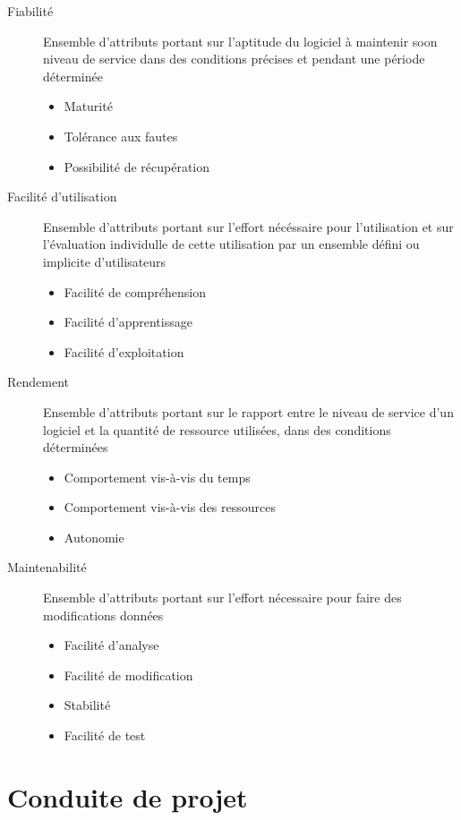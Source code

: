\documentclass{mise_en_page}
\begin{document}
\begin{description}
	\item[Fiabilité]
		Ensemble d'attributs portant sur l'aptitude du logiciel à maintenir soon niveau de service dans des conditions précises et pendant une période déterminée
		\begin{itemize}
			\item Maturité
			\item Tolérance aux fautes
			\item Possibilité de récupération
		\end{itemize}
	\item[Facilité d'utilisation]
		Ensemble d'attributs portant sur l'effort nécéssaire pour l'utilisation et sur l'évaluation individulle de cette utilisation par un ensemble défini ou implicite d'utilisateurs
		\begin{itemize}
			\item Facilité de compréhension
			\item Facilité d'apprentissage
			\item Facilité d'exploitation
		\end{itemize}
	\item[Rendement]
		Ensemble d'attributs portant sur le rapport entre le niveau de service d'un logiciel et la quantité de ressource utilisées, dans des conditions déterminées
		\begin{itemize}
			\item Comportement vis-à-vis du temps
			\item Comportement vis-à-vis des ressources
			\item Autonomie
		\end{itemize}
	\item[Maintenabilité]
		Ensemble d'attributs portant sur l'effort nécessaire pour faire des modifications données
		\begin{itemize}
			\item Facilité d'analyse
			\item Facilité de modification
			\item Stabilité
			\item Facilité de test
		\end{itemize}
\end{description}

\section{Conduite de projet}
\end{document}
